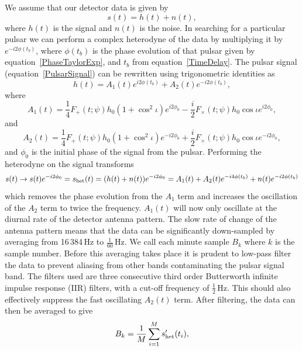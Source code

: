 We assume that our \gw detector data is given by
\begin{equation}
s(t) = h(t) + n(t),
\end{equation}
where $h(t)$ is the \gw signal and $n(t)$ is the noise. In searching for a particular pulsar we can
perform a complex heterodyne of the data by multiplying it by $e^{-i2\phi(t_b)}$, where $\phi(t_b)$
is the phase evolution of that pulsar given by equation~\ref{PhaseTaylorExp}, and $t_b$ from
equation~\ref{TimeDelay}. The pulsar signal (equation~\ref{PulsarSignal}) can be rewritten using
trigonometric identities as
\begin{equation}
h(t) = A_1(t)e^{i2\phi(t_b)} + A_2(t)e^{-i2\phi(t_b)},
\end{equation}
where
\begin{equation}
A_1(t) = \frac{1}{4}F_{+}(t;\psi)h_0(1+\cos^2\iota)e^{i2\phi_0} -
\frac{i}{2}F_{\times}(t;\psi)h_0\cos{\iota}e^{i2\phi_0},
\end{equation}
and
\begin{equation}
A_2(t) = \frac{1}{4}F_+(t;\psi)h_0(1+\cos^2\iota)e^{-i2\phi_0} +
\frac{i}{2}F_{\times}(t;\psi)h_0\cos{\iota}e^{-i2\phi_0},
\end{equation}
and $\phi_0$ is the initial phase of the \gw signal from the pulsar. Performing the heterodyne on
the signal transforms
\begin{equation}
s(t) \to s(t)e^{-i2\phi_0} = s_{\rm{het}}(t) = (h(t)+n(t))e^{-i2\phi_0} = A_1(t) +
A_2(t)e^{-i4\phi(t_b)} + n(t)e^{-i2\phi(t_b)}
\end{equation}
which removes the phase evolution from the $A_1$ term and increases the oscillation of the $A_2$
term to twice the \gw frequency. $A_1(t)$ will now only oscillate at the diurnal rate of the
detector antenna pattern. The slow rate of change of the antenna pattern means that the data can be
significantly down-sampled by averaging from 16\,384\,Hz to $\frac{1}{60}$\,Hz. We call each
minute sample $B_k$ where $k$ is the sample number. Before this averaging takes place it is prudent
to low-pass filter the data to prevent aliasing from other bands contaminating the pulsar signal
band. The filters used are three consecutive third order Butterworth infinite impulse response (IIR)
filters, with a cut-off frequency of $\frac{1}{2}$\,Hz. This should also effectively suppress the
fast oscillating $A_2(t)$ term. After filtering, the data can then be averaged to give
\begin{equation}
B_k = \frac{1}{M}\sum_{i=1}^M s'_{\rm{het}}(t_i),
\end{equation}
